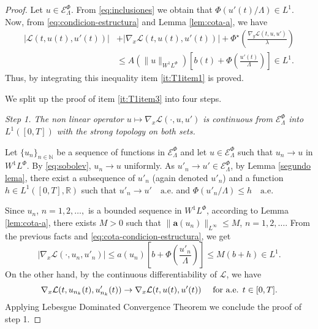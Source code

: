 \documentclass[twoside]{article}
\theoremstyle{remark}
\newcommand{\lphi}{L^{\Phi}}
\newcommand{\wphi}{W^{1}\lphi}
\newcommand{\sobnor}{\|_{W^{1}\lphi}}
\newcommand{\domi}{\mathcal{E}^{\Phi}}
\renewcommand{\b}[1]{\boldsymbol{#1}}
\newcommand{\rr}{\mathbb{R}}
\renewcommand{\leq}{\leqslant}
\begin{document}
\begin{proof}
Let $u\in \domi_{\Lambda}$. From \eqref{eq:inclusiones} we obtain that $\Phi( u'(t)/\Lambda) \in L^1$.
Now, from  \eqref{eq:condicion-estructura} and Lemma \ref{lem:cota-a}, we have
 \begin{equation}\label{eq:cota-condicion-estructura}
   \begin{split}
|\mathcal{L}(t,u(t),u'(t))|&+ |\nabla_x\mathcal{L}(t,u(t),u'(t))|
+\Phi^{\star}\left(\frac{\nabla_y\mathcal{L}(t,u,u')}{\lambda}\right)
\\
&\leq A(\|u\sobnor ) \left[b(t)+ \Phi\left(\frac{u'(t)}{\Lambda}\right) \right]\in
 L^1.
\end{split}
\end{equation}
Thus, by integrating this inequality item \eqref{it:T1item1} is proved.

We split up the proof of item \ref{it:T1item3} into four steps.

\noindent\emph{Step 1. The non linear operator  $u \mapsto \nabla_x\mathcal{L}(\cdot,u,u')$ is continuous from $\domi_{\Lambda}$ into $L^{1}([0,T])$ with the strong topology on both sets.} 



Let   $\{u_n\}_{n\in \mathbb{N}}$ be a sequence of  functions in $\domi_{\Lambda}$  
and let $u\in \domi_{\Lambda}$  such that $u_n\rightarrow u$ in $\wphi$.
By \eqref{eq:sobolev},  $u_n \to u$ uniformly.
As $u'_n\rightarrow u'\in\domi_{\Lambda}$, by 
  Lemma \ref{segundo lema}, there exist a subsequence of  $u'_{n}$ (again denoted $u'_{n}$) and a function  
	$h\in L^1([0,T],\rr)$
	such that  $u'_{n}\rightarrow u' \quad\text{a.e.}$ and $\Phi(u'_{n}/\Lambda)\leq h\quad\text{a.e}$.  

Since $u_{n}$, $n=1,2,\ldots,$ is a bounded sequence in $\wphi$, according to  Lemma \ref{lem:cota-a}, 
there exists $M>0$ such that $\|\b{a}(u_{n})\|_{L^{\infty}} \leq M$, $n=1,2,\ldots$.  
From the previous facts and \eqref{eq:cota-condicion-estructura}, we get
\begin{equation*}\label{eq:DxL1-bis}
  |\nabla_x\mathcal{L}(\cdot,u_{n},u'_{n})|\leq a(u_{n})\left[b+\Phi\left(\frac{u'_{n}}{\Lambda}\right)\right]\leq
M (b+h) \in L^1.
\end{equation*}
On the other hand, by the continuous differentiability of $\mathcal{L}$, we have
\[\nabla_x\mathcal{L}(t,u_{n_k}(t),u'_{n_k}(t))\to \nabla_x\mathcal{L}(t,u(t),u'(t))\quad\hbox{ for a.e. } t\in[0,T].\]
Applying Lebesgue Dominated Convergence Theorem we conclude the proof of step 1.



\end{proof}
\end{document}
